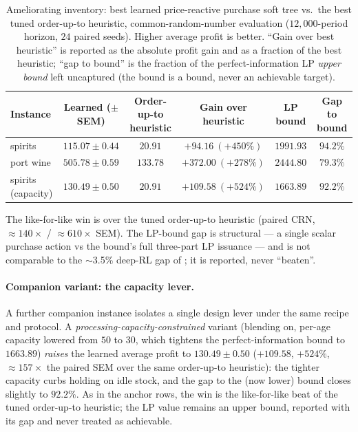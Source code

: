 \documentclass[11pt]{article}
\begin{document}
\begin{table}[!htbp]
\centering
\small
\caption{Ameliorating inventory: best learned price-reactive purchase soft tree vs.\ the best tuned
order-up-to heuristic, common-random-number evaluation ($12{,}000$-period horizon, $24$ paired seeds).
Higher average profit is better. ``Gain over best heuristic'' is reported as the absolute profit gain and as a
fraction of the best heuristic; ``gap to bound'' is the fraction of the perfect-information LP \emph{upper bound}
left uncaptured (the bound is a bound, never an achievable target).}
\label{tab:amelior-results}
\begin{tabular}{lccccc}
\toprule
Instance & Learned ($\pm$ SEM) & Order-up-to heuristic & Gain over heuristic & LP bound & Gap to bound \\
\midrule
spirits & $\mathbf{115.07\pm0.44}$ & $20.91$  & $+94.16\ (+450\%)$ & $1991.93$ & $94.2\%$ \\
port wine    & $\mathbf{505.78\pm0.59}$ & $133.78$ & $+372.00\ (+278\%)$ & $2444.80$ & $79.3\%$ \\
\addlinespace
spirits (capacity)  & $\mathbf{130.49\pm0.50}$ & $20.91$ & $+109.58\ (+524\%)$ & $1663.89$ & $92.2\%$ \\
\bottomrule
\end{tabular}
\par\medskip\footnotesize The like-for-like win is over the tuned order-up-to heuristic (paired CRN,
$\approx140\times$ / $\approx610\times$ SEM). The LP-bound gap is structural --- a single scalar
purchase action vs the bound's full three-part LP issuance --- and is not comparable to the
$\sim$3.5\% deep-RL gap of \citet{pahrGrunow2025}; it is reported, never ``beaten''.
\end{table}
\FloatBarrier

\paragraph{Companion variant: the capacity lever.}
A further companion instance isolates a single design lever under the same recipe and protocol. A
\emph{processing-capacity-constrained} variant (blending on, per-age capacity lowered from $50$ to
$30$, which tightens the perfect-information bound to $1663.89$) \emph{raises} the learned average
profit to $130.49\pm0.50$ ($+109.58$, $+524\%$, $\approx\!157\times$ the paired SEM over the same
order-up-to heuristic): the tighter capacity curbs holding on idle stock, and the gap to the (now lower)
bound closes slightly to $92.2\%$. As in the anchor rows, the win is the like-for-like beat of the
tuned order-up-to heuristic; the LP value remains an upper bound, reported with its gap and never treated
as achievable.
\end{document}
